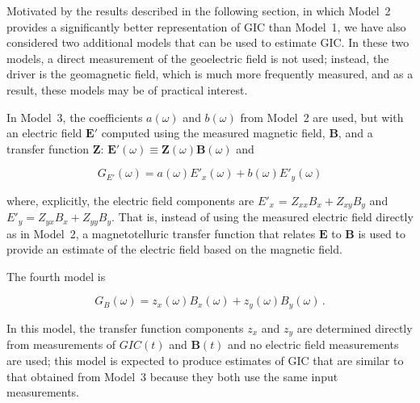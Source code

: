 \documentclass[draft,linenumbers]{agujournal2018}
\begin{document}
Motivated by the results described in the following section, in which Model~2 provides a significantly better representation of GIC than Model~1, we have also considered two additional models that can be used to estimate GIC. In these two models, a direct measurement of the geoelectric field is not used; instead, the driver is the geomagnetic field, which is much more frequently measured, and as a result, these models may be of practical interest.

In Model~3, the coefficients $a(\omega)$ and $b(\omega)$ from Model~2 are used, but with an electric field $\mathbf{E}'$ computed using the measured magnetic field, $\mathbf{B}$, and a transfer function $\boldsymbol{Z}$: $\mathbf{E}'(\omega) \equiv \boldsymbol{Z}(\omega)\mathbf{B}(\omega)$ and

\setcounter{equation}{2}
\begin{linenomath*}
  \begin{equation}
    G_{E'}(\omega) = a(\omega)E'_x(\omega) + b(\omega)E'_y(\omega)
    \label{model3}
  \end{equation}
\end{linenomath*}

\noindent
where, explicitly, the electric field components are $E'_x$ = $Z_{xx}B_x + Z_{xy}B_y$ and $E'_y = Z_{yx}B_x + Z_{yy}B_y$.
That is, instead of using the measured electric field directly as in Model~2, a magnetotelluric transfer function that relates $\mathbf{E}$ to $\mathbf{B}$ is used to provide an estimate of the electric field based on the magnetic field.

The fourth model is

\begin{linenomath*}
  \begin{equation}
    G_B(\omega) = z_x(\omega)B_x(\omega) + z_y(\omega)B_y(\omega)\,.
    \label{model4}
  \end{equation}
\end{linenomath*}

\noindent
In this model, the transfer function components $z_x$ and $z_y$ are determined directly from measurements of $GIC(t)$ and $\mathbf{B}(t)$ and no electric field measurements are used; this model is expected to produce estimates of GIC that are similar to that obtained from Model~3 because they both use the same input measurements.
\end{document}
